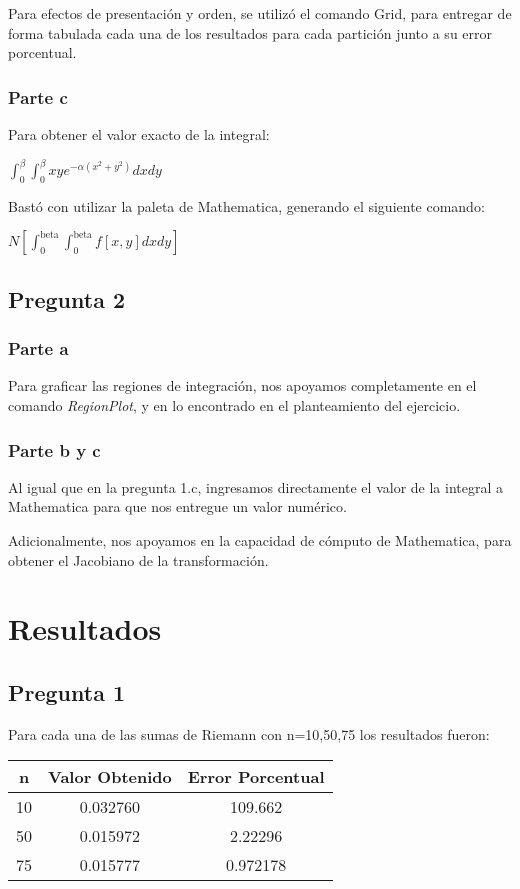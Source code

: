 \documentclass[12pt,letterpaper]{article}
\begin{document}
Para efectos de presentación y orden, se utilizó el comando Grid, para entregar de forma tabulada cada una de los resultados para cada partición junto a su error porcentual.

\subsubsection{Parte c}
Para obtener el valor exacto de la integral: 
\begin{center}$\int_0^{\beta}\int_0^{\beta} xye^{-\alpha(x^2+y^2)} dxdy$\end{center}

Bastó con utilizar la paleta de Mathematica, generando el siguiente comando:
\begin{center}
$N\left[\int _0^{\text{beta}}\int _0^{\text{beta}}f[x,y]dxdy\right]$\end{center}

\subsection{Pregunta 2}
\subsubsection{Parte a}
Para graficar las regiones de integración, nos apoyamos completamente en el comando \textit{RegionPlot}, y en lo encontrado en el planteamiento del ejercicio.

\subsubsection{Parte b y c}
Al igual que en la pregunta 1.c, ingresamos directamente el valor de la integral a Mathematica para que nos entregue un valor numérico.

Adicionalmente, nos apoyamos en la capacidad de cómputo de Mathematica, para obtener el Jacobiano de la transformación.


\section{Resultados}
\subsection{Pregunta 1}
Para cada una de las sumas de Riemann con n=10,50,75 los resultados fueron:

\begin{center}
\begin{tabular}{|c|c|c|}
\hline
 \textbf{n} & \textbf{Valor Obtenido} & \textbf{Error Porcentual} \\ \hline
 10 & 0.032760 & 109.662 \\\hline
 50 & 0.015972 & 2.22296 \\\hline
 75 & 0.015777 & 0.972178 \\\hline
\end{tabular}
\end{center}
\end{document}
